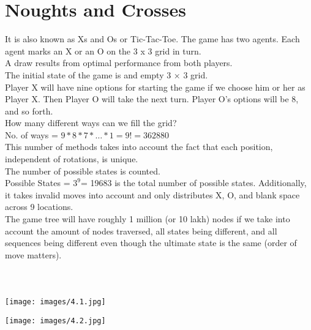 \documentclass[conference]{IEEEtran}
\begin{document}
\section{Noughts and Crosses}
It is also known as Xs and Os or Tic-Tac-Toe. The game has two agents. Each agent marks an X or an O on the 3 x 3 grid in turn.\\
\indent A draw results from optimal performance from both players.\\
The initial state of the game is and empty 3 × 3 grid.\\
Player X will have nine options for starting the game if we choose him or her as Player X. Then Player O will take the next turn. Player O's options will be 8, and so forth.\\
How many different ways can we fill the grid?\\
\indent No. of ways = $9 * 8 * 7 * \dots * 1 = 9! = 362880$ \\
This number of methods takes into account the fact that each position, independent of rotations, is unique.\\
The number of possible states is counted.\\
\indent Possible States = $3^9 $= 19683 is the total number of possible states.
Additionally, it takes invalid moves into account and only distributes X, O, and blank space across 9 locations.\\
\indent The game tree will have roughly 1 million (or 10 lakh) nodes if we take into account the amount of nodes traversed, all states being different, and all sequences being different even though the ultimate state is the same (order of move matters).\\ \\ \\ \\ 
\texttt{[image: images/4.1.jpg]}
\begin{center}
\texttt{[image: images/4.2.jpg]}
\end{center}
\end{document}
